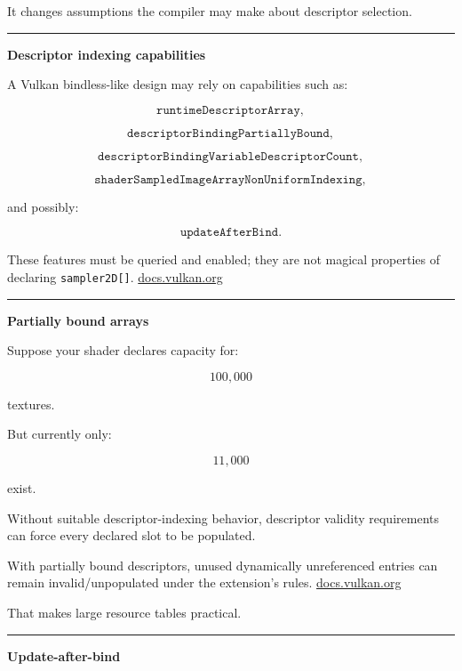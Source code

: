 It changes assumptions the compiler may make about descriptor selection.

\begin{center}\rule{0.5\linewidth}{0.5pt}\end{center}

\textbf{Descriptor indexing capabilities}

A Vulkan bindless-like design may rely on capabilities such as:

\[
\texttt{runtimeDescriptorArray},
\]

\[
\texttt{descriptorBindingPartiallyBound},
\]

\[
\texttt{descriptorBindingVariableDescriptorCount},
\]

\[
\texttt{shaderSampledImageArrayNonUniformIndexing},
\]

and possibly:

\[
\texttt{updateAfterBind}.
\]

These features must be queried and enabled; they are not magical properties of declaring \texttt{sampler2D{[}{]}}. \href{https://docs.vulkan.org/guide/latest/extensions/VK_EXT_descriptor_indexing.html?utm_source=chatgpt.com}{docs.vulkan.org}

\begin{center}\rule{0.5\linewidth}{0.5pt}\end{center}

\textbf{Partially bound arrays}

Suppose your shader declares capacity for:

\[
100,000
\]

textures.

But currently only:

\[
11,000
\]

exist.

Without suitable descriptor-indexing behavior, descriptor validity requirements can force every declared slot to be populated.

With partially bound descriptors, unused dynamically unreferenced entries can remain invalid/unpopulated under the extension's rules. \href{https://docs.vulkan.org/spec/latest/chapters/descriptorsets.html?utm_source=chatgpt.com}{docs.vulkan.org}

That makes large resource tables practical.

\begin{center}\rule{0.5\linewidth}{0.5pt}\end{center}

\textbf{Update-after-bind}

